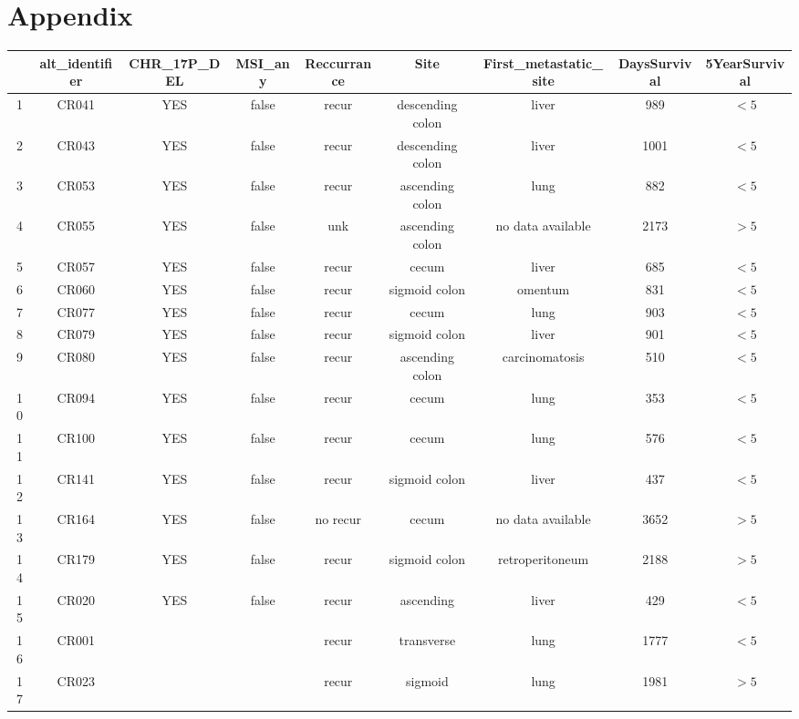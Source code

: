 \section{Appendix}
\begin{table}
  \centering
  \caption{IMC colorectal cancer metadata }
  \begin{longtable}{|c|c|c|c|c|c|c|c|c|}
\hline
 & \textbf{alt\_identifier} & \textbf{CHR\_17P\_DEL} & \textbf{MSI\_any} & \textbf{Reccurrance} & \textbf{Site} & \textbf{First\_metastatic\_site} & \textbf{DaysSurvival} & \textbf{5YearSurvival} \\
\hline
1 & CR041 & YES & false & recur & descending colon & liver & 989 & $<5$ \\
\hline
2 &CR043 & YES & false & recur & descending colon & liver & 1001 & $<5$ \\
\hline
3 & CR053 & YES & false & recur & ascending colon & lung & 882 & $<5$ \\
\hline
4 & CR055 & YES & false & unk & ascending colon & no data available & 2173 & $>5$ \\
\hline
5 & CR057 & YES & false & recur & cecum & liver & 685 & $<5$ \\
\hline
6 & CR060 & YES & false & recur & sigmoid colon & omentum & 831 & $<5$ \\
\hline
7 &CR077 & YES & false & recur & cecum & lung & 903 & $<5$ \\
\hline
8 & CR079 & YES & false & recur & sigmoid colon & liver & 901 & $<5$ \\
\hline
9 & CR080 & YES & false & recur & ascending colon & carcinomatosis & 510 & $<5$ \\
\hline
10 & CR094 & YES & false & recur & cecum & lung & 353 & $<5$ \\
\hline
11 & CR100 & YES & false & recur & cecum & lung & 576 & $<5$ \\
\hline
12 & CR141 & YES & false & recur & sigmoid colon & liver & 437 & $<5$ \\
\hline
13 & CR164 & YES & false & no recur & cecum & no data available & 3652 & $>5$ \\
\hline
14 & CR179 & YES & false & recur & sigmoid colon & retroperitoneum & 2188 & $>5$ \\
\hline
15 & CR020 & YES & false & recur & ascending & liver & 429 & $<5$ \\
\hline
16 & CR001 &  &  & recur & transverse  & lung & 1777 & $<5$ \\
\hline
17 & CR023 &  &  & recur & sigmoid & lung & 1981 & $>5$ \\

\end{longtable}
\end{table}
